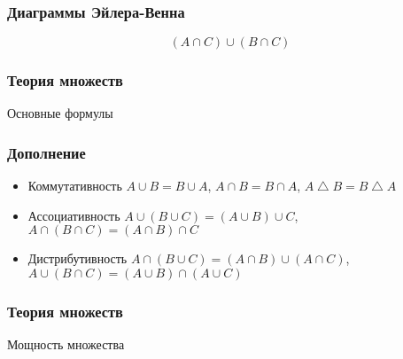 \begin{frame}
\frametitle{Диаграммы Эйлера-Венна}

 $$
(A \cap C)\cup (B \cap C)
        $$
				
\begin{center}

\end{center}

\end{frame}


\begin{frame}
\frametitle{Теория множеств}

\begin{center}

\Huge
Основные формулы
	
\end{center}


\end{frame}

\begin{frame}
\frametitle{Дополнение}

\begin{itemize}
	\item Коммутативность $ A \cup B= B\cup A$, $ A \cap B= B\cap A$, $ A \bigtriangleup B= B \bigtriangleup A$
	\item Ассоциативность $ A \cup (B\cup C)= (A \cup B)\cup C$, $  A \cap (B\cap C)= (A \cap B)\cap C$
	\item Дистрибутивность $ A \cap (B\cup C)= (A \cap B)\cup (A \cap C)$, $ A \cup (B\cap C)= (A \cup B)\cap (A \cup C)$
\end{itemize}

\end{frame}

\begin{frame}
\frametitle{Теория множеств}


\begin{center}

\Huge
Мощность множества	
\end{center}

\end{frame}

